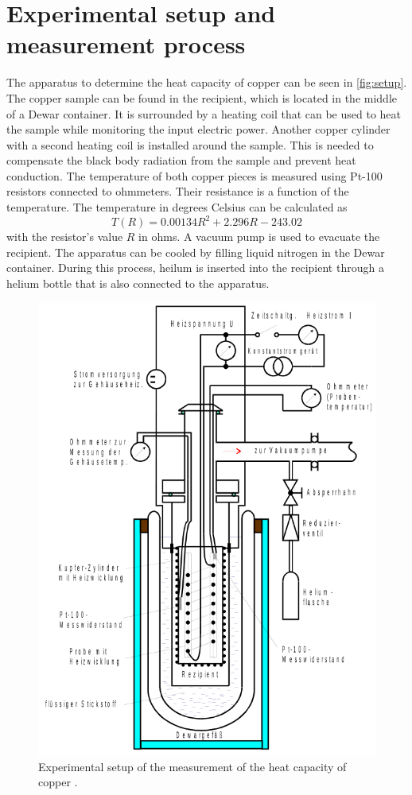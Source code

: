 \section{Experimental setup and measurement process}
\label{sec:Setup}
The apparatus to determine the heat capacity of copper can be seen in \autoref{fig:setup}.
The copper sample can be found in the recipient, which is located in the middle of a Dewar container. It is surrounded by a heating coil that can be used to
heat the sample while monitoring the input electric power. Another copper cylinder with a second heating coil is installed around the sample. This is needed to compensate the
black body radiation from the sample and prevent heat conduction.
The temperature of both copper pieces is measured using Pt-100 resistors connected to ohmmeters. Their resistance is a function of the temperature. The temperature in degrees Celsius can be calculated as
\begin{equation}
    \label{eqn:R_T}
    T(R) = \num{0.00134} R^2 + \num{2.296} R - \num{243.02}
\end{equation}
with the resistor's value $R$ in ohms.
A vacuum pump is used to evacuate the recipient. The apparatus can be cooled by filling liquid nitrogen in the Dewar container. During this process, heilum is inserted into the recipient
through a helium bottle that is also connected to the apparatus.

\begin{figure}
    \centering
    \includegraphics[width = .55\textwidth]{"content/pics/setup.png"}
    \caption{Experimental setup of the measurement of the heat capacity of copper \cite{V47}.}
    \label{fig:setup}
\end{figure}

